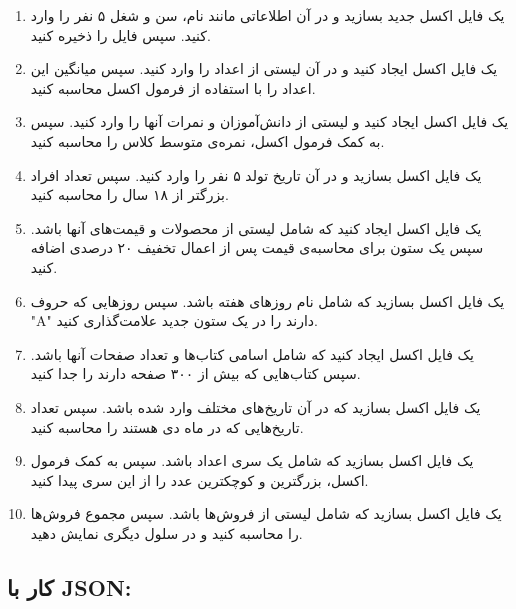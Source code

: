 \documentclass[a4paper,12pt]{article}
\begin{document}
	\begin{enumerate}
		\item یک فایل اکسل جدید بسازید و در آن اطلاعاتی مانند نام، سن و شغل ۵ نفر را وارد کنید. سپس فایل را ذخیره کنید.
		\item یک فایل اکسل ایجاد کنید و در آن لیستی از اعداد را وارد کنید. سپس میانگین این اعداد را با استفاده از فرمول اکسل محاسبه کنید.
		\item یک فایل اکسل ایجاد کنید و لیستی از دانش‌آموزان و نمرات آنها را وارد کنید. سپس به کمک فرمول اکسل، نمره‌ی متوسط کلاس را محاسبه کنید.
		\item یک فایل اکسل بسازید و در آن تاریخ تولد ۵ نفر را وارد کنید. سپس تعداد افراد بزرگتر از ۱۸ سال را محاسبه کنید.
		\item یک فایل اکسل ایجاد کنید که شامل لیستی از محصولات و قیمت‌های آنها باشد. سپس یک ستون برای محاسبه‌ی قیمت پس از اعمال تخفیف ۲۰ درصدی اضافه کنید.
		\item یک فایل اکسل بسازید که شامل نام روزهای هفته باشد. سپس روزهایی که حروف "A" دارند را در یک ستون جدید علامت‌گذاری کنید.
		\item یک فایل اکسل ایجاد کنید که شامل اسامی کتاب‌ها و تعداد صفحات آنها باشد. سپس کتاب‌هایی که بیش از ۳۰۰ صفحه دارند را جدا کنید.
		\item یک فایل اکسل بسازید که در آن تاریخ‌های مختلف وارد شده باشد. سپس تعداد تاریخ‌هایی که در ماه دی هستند را محاسبه کنید.
		\item یک فایل اکسل بسازید که شامل یک سری اعداد باشد. سپس به کمک فرمول اکسل، بزرگترین و کوچکترین عدد را از این سری پیدا کنید.
		\item یک فایل اکسل بسازید که شامل لیستی از فروش‌ها باشد. سپس مجموع فروش‌ها را محاسبه کنید و در سلول دیگری نمایش دهید.
	\end{enumerate}
	
	\subsection*{کار با JSON:}
	
\end{document}
